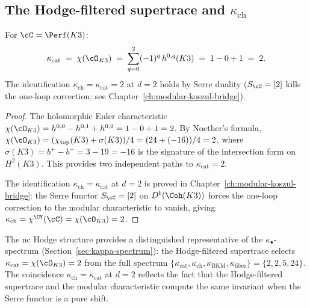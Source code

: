 \subsection{The Hodge-filtered supertrace and \texorpdfstring{$\kappa_{\mathrm{ch}}$}{kappa-ch}}
\label{subsec:nc-hodge-kappa}

\begin{proposition}
\label{prop:kappa-hodge-supertrace}
For $\cC = \Perf(K3)$:
\[
 \kappa_{\mathrm{cat}}
 \;=\; \chi(\cO_{K3})
 \;=\; \sum_{q=0}^{2} (-1)^q\, h^{0,q}(K3)
 \;=\; 1 - 0 + 1
 \;=\; 2.
\]
The identification $\kappa_{\mathrm{ch}} = \kappa_{\mathrm{cat}} = 2$
at $d = 2$ holds by Serre duality ($S_\cC = [2]$ kills the one-loop
correction; see Chapter~\ref{ch:modular-koszul-bridge}).
\end{proposition}

\begin{proof}
The holomorphic Euler characteristic $\chi(\cO_{K3}) = h^{0,0}
- h^{0,1} + h^{0,2} = 1 - 0 + 1 = 2$. By Noether's formula,
$\chi(\cO_{K3}) = (\chi_{\mathrm{top}}(K3) + \sigma(K3))/4
= (24 + (-16))/4 = 2$, where $\sigma(K3) = b^+ - b^- = 3 - 19
= -16$ is the signature of the intersection form on $H^2(K3)$.
This provides two independent paths to $\kappa_{\mathrm{cat}} = 2$.

The identification $\kappa_{\mathrm{ch}} = \kappa_{\mathrm{cat}}$
at $d = 2$ is proved in Chapter~\ref{ch:modular-koszul-bridge}: the Serre
functor $S_\cC = [2]$ on $D^b(\Coh(K3))$ forces the one-loop
correction to the modular characteristic to vanish, giving
$\kappa_{\mathrm{ch}} = \chi^{\CY}(\cC) = \chi(\cO_{K3}) = 2$.
\end{proof}

\begin{remark}
\label{rem:nc-hodge-kappa-spectrum}
The nc Hodge structure provides a distinguished representative of
the $\kappa_\bullet$-spectrum (Section~\ref{sec:kappa-spectrum}): the
Hodge-filtered supertrace selects $\kappa_{\mathrm{cat}} =
\chi(\cO_{K3}) = 2$ from the full spectrum
$\{\kappa_{\mathrm{cat}}, \kappa_{\mathrm{ch}},
\kappa_{\mathrm{BKM}}, \kappa_{\mathrm{fiber}}\}
= \{2, 2, 5, 24\}$. The coincidence
$\kappa_{\mathrm{ch}} = \kappa_{\mathrm{cat}}$ at $d = 2$ reflects
the fact that the Hodge-filtered supertrace and the modular
characteristic compute the same invariant when the Serre functor
is a pure shift.
\end{remark}

